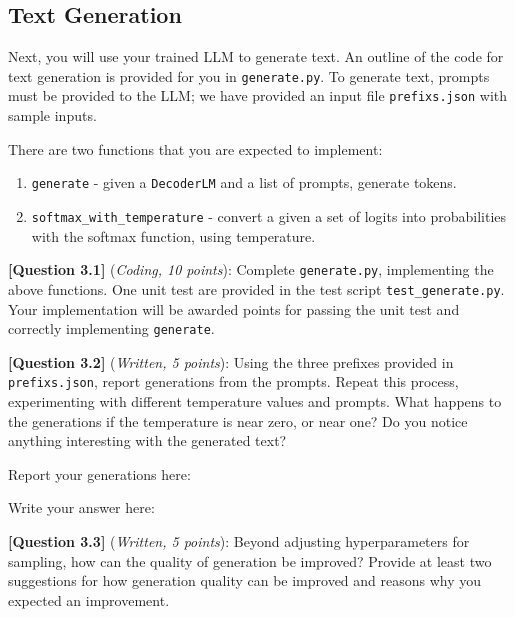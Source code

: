 \documentclass[leqno,12pt]{article}
\begin{document}
\subsection*{Text Generation}

Next, you will use your trained LLM to generate text.
An outline of the code for text generation is provided for you in \texttt{generate.py}. To generate text, prompts must be provided to the LLM; we have provided an input file \texttt{prefixs.json} with sample inputs.
\newline

\noindent There are two functions that you are expected to implement:
\begin{enumerate}
    \item \texttt{generate} - given a \texttt{DecoderLM} and a list of prompts, generate tokens.
    \item \texttt{softmax\_with\_temperature} - convert a given a set of logits into probabilities with the softmax function, using temperature.
\end{enumerate}

\noindent \textbf{[Question 3.1]} (\emph{Coding, 10 points}): Complete \texttt{generate.py}, implementing the above functions. One unit test are provided in the test script \texttt{test\_generate.py}. Your implementation will be awarded points for passing the unit test and correctly implementing \texttt{generate}.
\newline

\noindent \textbf{[Question 3.2]} (\emph{Written, 5 points}):
Using the three prefixes provided in \texttt{prefixs.json}, report generations from the prompts. Repeat this process, experimenting with different temperature values and prompts. What happens to the generations if the temperature is near zero, or near one? Do you notice anything interesting with the generated text?
\newline

\noindent
Report your generations here:
\begin{tcolorbox}[fit,height=6cm, width=\linewidth, blank, borderline={1pt}{-2pt}]
\end{tcolorbox}
\clearpage

\noindent
Write your answer here:
\begin{tcolorbox}[fit,height=2cm, width=\linewidth, blank, borderline={1pt}{-2pt}]
\end{tcolorbox}

\noindent \textbf{[Question 3.3]} (\emph{Written, 5 points}):
Beyond adjusting hyperparameters for sampling, how can the quality of generation be improved? Provide at least two suggestions for how generation quality can be improved and reasons why you expected an improvement. 
\newline
\end{document}
